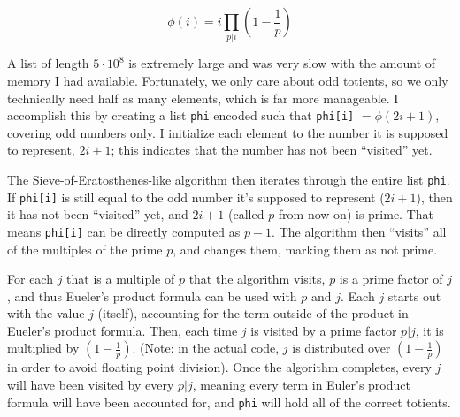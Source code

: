 \documentclass[11pt]{article}
\begin{document}
\begin{equation*}
\displaystyle
\phi(i) = i\prod_{p|i}(1 - \frac{1}{p})
\end{equation*}

A list of length $5 \cdot 10^8$ is extremely large and was very slow with the amount of memory I had available. Fortunately, we only care about odd totients, so we only technically need half as many elements, which is far more manageable. I accomplish this by creating a list \verb!phi! encoded such that \verb!phi[i]! $= \phi(2i+1)$, covering odd numbers only. I initialize each element to the number it is supposed to represent, $2i + 1$; this indicates that the number has not been ``visited'' yet.

The Sieve-of-Eratosthenes-like algorithm then iterates through the entire list \verb!phi!. If \verb!phi[i]! is still equal to the odd number it's supposed to represent ($2i+1$), then it has not been  ``visited'' yet, and $2i + 1$ (called $p$ from now on) is prime. That means \verb!phi[i]! can be directly computed as $p-1$. The algorithm then ``visits'' all of the multiples of the prime $p$, and changes them, marking them as not prime.

For each $j$ that is a multiple of $p$ that the algorithm visits, $p$ is a prime factor of $j$, and thus Eueler's product formula can be used with $p$ and $j$. Each $j$ starts out with the value $j$ (itself), accounting for the term outside of the product in Eueler's product formula. Then, each time $j$ is visited by a prime factor $p|j$, it is multiplied by $(1-\frac{1}{p})$. (Note: in the actual code, $j$ is distributed over $(1-\frac{1}{p})$ in order to avoid floating point division). Once the algorithm completes, every $j$ will have been visited by every $p|j$, meaning every term in Euler's product formula will have been accounted for, and \verb!phi! will hold all of the correct totients.
\end{document}
